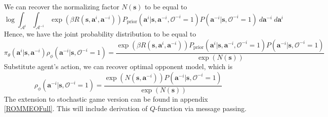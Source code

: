 We can recover the normalizing factor $N(\boldsymbol{s})$ to be equal to 
\begin{equation}
    \log \int_{\mathcal{A}^i} \int_{\mathcal{A}^{-i}} \exp\left(\beta R(\boldsymbol{s}, \boldsymbol{a}^i, \boldsymbol{a}^{-i})\right)P_{\text{prior}}(\boldsymbol{a}^i | \boldsymbol{s}, \boldsymbol{a}^{-i}, \mathcal{O}^{-i} = 1)P(\boldsymbol{a}^{-i} |\boldsymbol{s}, \mathcal{O}^{-i} = 1) \  d\boldsymbol{a}^{-i} \ d\boldsymbol{a}^i
\end{equation}
Hence, we have the joint probability distribution to be equal to 
\begin{equation}
    \pi_{\theta}(\boldsymbol{a}^i | \boldsymbol{s}, \boldsymbol{a}^{-i}) \rho_{\phi}(\boldsymbol{a}^{-i} | \boldsymbol{s}, \mathcal{O}^{-i} = 1) = \frac{\exp\left(\beta R(\boldsymbol{s}, \boldsymbol{a}^i, \boldsymbol{a}^{-i})\right)P_{\text{prior}}(\boldsymbol{a}^i | \boldsymbol{s}, \boldsymbol{a}^{-i}, \mathcal{O}^{-i} = 1)P(\boldsymbol{a}^{-i} |\boldsymbol{s}, \mathcal{O}^{-i} = 1)}{\exp (N(\boldsymbol{s}))}
\end{equation}
Substitute agent's action, we can recover optimal opponent model, which is 
\begin{equation}
    \rho_{\phi}(\boldsymbol{a}^{-i} | \boldsymbol{s}, \mathcal{O}^{-i} = 1) = \frac{\exp (N(\boldsymbol{s}, \boldsymbol{a}^{-i})) P(\boldsymbol{a}^{-i} |\boldsymbol{s}, \mathcal{O}^{-i} = 1)}{\exp (N(\boldsymbol{s}))}
\end{equation}
The extension to stochastic game version can be found in appendix \ref{ROMMEOFull}. This will include derivation of $Q$-function via message passing.

